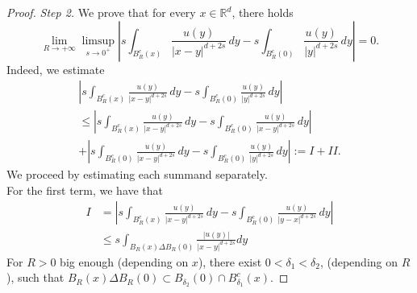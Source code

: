 \documentclass[reqno,11pt]{amsart}
\numberwithin{equation}{section}
\theoremstyle{definition} %
\theoremstyle{plain}
\theoremstyle{definition}
\theoremstyle{remark}
\def\R{\mathbb{R}}
\newcommand{\abs}[1]{\left|#1\right|}
\begin{document}
\begin{proof}
    \textit{Step 2.} We prove that for every $x\in\R^d$, there holds
    \begin{equation}
    \label{claim:step2}
    \lim_{R\to+\infty}\limsup_{s\to 0^+}   \left|s\int_{B_R^c(x)}\frac{u(y)}{\abs{x-y}^{d+2s}}\,dy-s\int_{B_R^c(0)}\frac{u(y)}{\abs{y}^{d+2s}}\,dy\right|=0.
    \end{equation}
    Indeed, we estimate
     \begin{multline*}
          \left|s\int_{B_R^c(x)}\frac{u(y)}{\abs{x-y}^{d+2s}}\,dy-s\int_{B_R^c(0)}\frac{u(y)}{\abs{y}^{d+2s}}\,dy\right|\\ \leq \left|s\int_{B_R^c(x)}\frac{u(y)}{\abs{x-y}^{d+2s}}\,dy-s\int_{B_R^c(0)}\frac{u(y)}{\abs{x-y}^{d+2s}}\,dy\right|\\
            +\left|s\int_{B_R^c(0)}\frac{u(y)}{\abs{x-y}^{d+2s}}\,dy-s\int_{B_R^c(0)}\frac{u(y)}{\abs{y}^{d+2s}}\,dy\right|
            :=I+II.
    \end{multline*}
    We proceed by estimating each summand separately.\\
    For the first term, we have that
    \begin{equation*}
        \begin{split}
            I&=\left|s\int_{B_R^c(x)}\frac{u(y)}{\abs{x-y}^{d+2s}}\,dy-s\int_{B_R^c(0)}\frac{u(y)}{\abs{y-x}^{d+2s}}\,dy\right|\\
            &  \leq s\int_{B_R(x)\Delta B_R(0)}\frac{\abs{u(y)}}{\abs{x-y}^{d+2s}}dy
        \end{split}
    \end{equation*}
    For $R>0$ big enough (depending on $x$), there exist $0<\delta_1<\delta _2$, (depending on $R$), such that $B_R(x)\Delta B_R(0)\subset B_{\delta_2}(0)\cap B_{\delta_1}^c(x)$. 
    

\end{proof}
\end{document}
